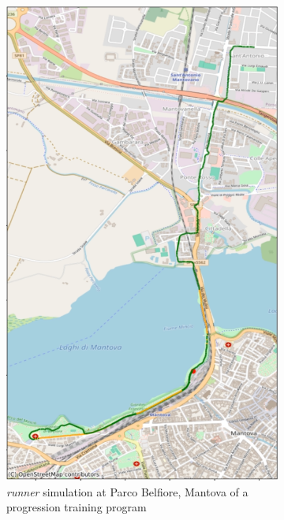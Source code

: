 \begin{figure}[h!]
\begin{subfigure}[t]{0.305\textwidth}
        \includegraphics[width=\textwidth]{images/runner-belfiore.png}
        \caption{\textit{runner} simulation at Parco Belfiore, Mantova of a progression training program}
    \label{fig:video-runner}
    \end{subfigure}
    \begin{subfigure}[t]{0.31\textwidth}
        \centering

\end{subfigure}
\end{figure}

